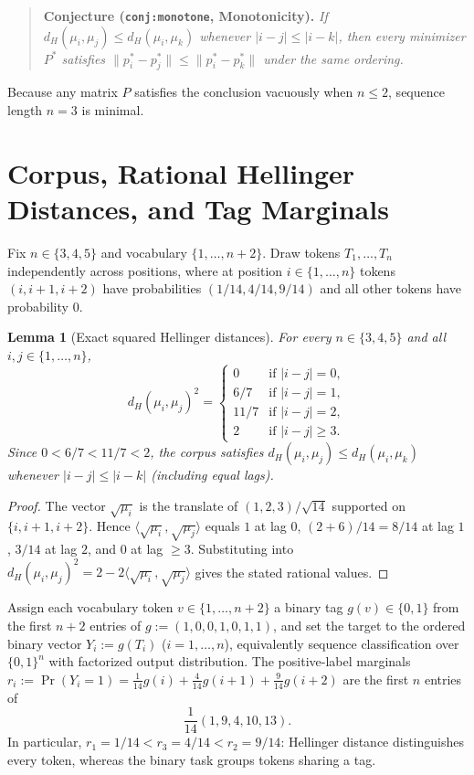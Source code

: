 \documentclass[11pt]{article}
\theoremstyle{plain}
\newtheorem{lemma}[theorem]{Lemma}
\theoremstyle{definition}
\theoremstyle{remark}
\begin{document}
\begin{quote}
\textbf{Conjecture (\texttt{conj:monotone}, Monotonicity).}
\emph{If $d_H(\mu_i, \mu_j) \le d_H(\mu_i, \mu_k)$ whenever $|i - j| \le |i - k|$, then every minimizer $P^*$ satisfies $\|p_i^* - p_j^*\| \le \|p_i^* - p_k^*\|$ under the same ordering.}
\end{quote}

Because any matrix $P$ satisfies the conclusion vacuously when $n \le 2$, sequence length $n = 3$ is minimal.

\section{Corpus, Rational Hellinger Distances, and Tag Marginals}

Fix $n \in \{3, 4, 5\}$ and vocabulary $\{1, \dots, n+2\}$. Draw tokens $T_1, \dots, T_n$ independently across positions, where at position $i \in \{1, \dots, n\}$ tokens $(i, i+1, i+2)$ have probabilities $(1/14, 4/14, 9/14)$ and all other tokens have probability $0$.

\begin{lemma}[Exact squared Hellinger distances]\label{lem:hellinger}
For every $n \in \{3, 4, 5\}$ and all $i, j \in \{1, \dots, n\}$,
\[
d_H(\mu_i, \mu_j)^2 = \begin{cases}
0 & \text{if } |i - j| = 0,\\
6/7 & \text{if } |i - j| = 1,\\
11/7 & \text{if } |i - j| = 2,\\
2 & \text{if } |i - j| \ge 3.
\end{cases}
\]
Since $0 < 6/7 < 11/7 < 2$, the corpus satisfies $d_H(\mu_i, \mu_j) \le d_H(\mu_i, \mu_k)$ whenever $|i - j| \le |i - k|$ (including equal lags).
\end{lemma}

\begin{proof}
The vector $\sqrt{\mu_i}$ is the translate of $(1, 2, 3)/\sqrt{14}$ supported on $\{i, i+1, i+2\}$. Hence $\langle \sqrt{\mu_i}, \sqrt{\mu_j} \rangle$ equals $1$ at lag $0$, $(2 + 6)/14 = 8/14$ at lag $1$, $3/14$ at lag $2$, and $0$ at lag $\ge 3$. Substituting into $d_H(\mu_i, \mu_j)^2 = 2 - 2\langle \sqrt{\mu_i}, \sqrt{\mu_j} \rangle$ gives the stated rational values.
\end{proof}

Assign each vocabulary token $v \in \{1, \dots, n+2\}$ a binary tag $g(v) \in \{0, 1\}$ from the first $n + 2$ entries of $g := (1, 0, 0, 1, 0, 1, 1)$, and set the target to the ordered binary vector $Y_i := g(T_i)$ ($i = 1, \dots, n$), equivalently sequence classification over $\{0, 1\}^n$ with factorized output distribution. The positive-label marginals $r_i := \Pr(Y_i = 1) = \frac{1}{14}g(i) + \frac{4}{14}g(i+1) + \frac{9}{14}g(i+2)$ are the first $n$ entries of
\begin{equation}\label{eq:rates}
\frac{1}{14}(1, 9, 4, 10, 13).
\end{equation}
In particular, $r_1 = 1/14 < r_3 = 4/14 < r_2 = 9/14$: Hellinger distance distinguishes every token, whereas the binary task groups tokens sharing a tag.
\end{document}
